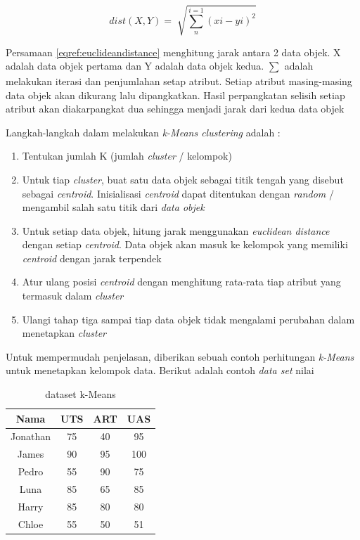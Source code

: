 \documentclass[a4paper,twoside]{article}
\begin{document}
\begin{enumerate}
\begin{equation}
	dist(X,Y) = \sqrt[]{\sum_{n}^{i=1}(xi-yi)^2}
	\label{eqref:euclideandistance}
\end{equation}

Persamaan \eqref{eqref:euclideandistance} menghitung jarak antara 2 data objek. X adalah data objek pertama dan Y adalah data objek kedua. $\sum_{}^{}$ adalah melakukan iterasi dan penjumlahan setap atribut. Setiap atribut masing-masing data objek akan dikurang lalu dipangkatkan. Hasil perpangkatan selisih setiap atribut akan diakarpangkat dua sehingga menjadi jarak dari kedua data objek

Langkah-langkah dalam melakukan \textit{k-Means clustering} adalah : 
\begin{enumerate}
\item Tentukan jumlah K (jumlah \textit{cluster} / kelompok)
\item Untuk tiap \textit{cluster}, buat satu data objek sebagai titik tengah yang disebut sebagai \textit{centroid}. Inisialisasi \textit{centroid} dapat ditentukan dengan \textit{random} / mengambil salah satu titik dari \textit{data objek} 
\item Untuk setiap data objek, hitung jarak menggunakan \textit{euclidean distance} dengan setiap \textit{centroid}. Data objek akan masuk ke kelompok yang memiliki \textit{centroid} dengan jarak terpendek
\item Atur ulang posisi \textit{centroid} dengan menghitung rata-rata tiap atribut yang termasuk dalam \textit{cluster} 
\item Ulangi tahap tiga sampai tiap data objek tidak mengalami perubahan dalam menetapkan \textit{cluster}
\end{enumerate}

Untuk mempermudah penjelasan, diberikan sebuah contoh perhitungan \textit{k-Means} untuk menetapkan kelompok data. Berikut adalah contoh \textit{data set} nilai 

\begin{table}[ht]
\centering
\begin{tabular}{|c|c|c|c|}
\hline 
Nama & UTS & ART & UAS \\ 
\hline 
Jonathan & 75 & 40 & 95 \\ 
\hline 
James & 90 & 95 & 100 \\ 
\hline 
Pedro & 55 & 90 & 75 \\ 
\hline 
Luna & 85 & 65 & 85 \\ 
\hline 
Harry & 85 & 80 & 80 \\ 
\hline 
Chloe & 55 & 50 & 51 \\ 
\hline 
\end{tabular} 
\caption{dataset k-Means}
\label{tab:datasetkmeans}
\end{table}


\end{enumerate}
\end{document}
